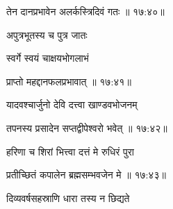 
{\devanagarifont तेन दानप्रभावेन अलर्कस्त्रिदिवं गतः {॥ १७:४०॥} \veg\dontdisplaylinenum }%

\ujvers{}

\nemslokab

{\devanagarifont अपुत्रभूतस्य च पुत्र जातः  \danda\dontdisplaylinenum }%
 
\nemslokac

{\devanagarifont स्वर्गे स्वयं चाक्षयभोगलाभं }%
  \dontdisplaylinenum    {}%



\nemslokad

{\devanagarifont प्राप्तो महद्दानफलप्रभावात् {॥ १७:४१॥} \veg\dontdisplaylinenum }%
 
\vers


{\devanagarifont यादवश्चार्जुनो देवि दत्त्वा खाण्डवभोजनम् \thinspace{\dandab} \dontdisplaylinenum }%


{\devanagarifont तपनस्य प्रसादेन सप्तद्वीपेश्वरो भवेत् {॥ १७:४२॥} \veg\dontdisplaylinenum }%

{\devanagarifont हरिणा च शिरां भित्त्वा दत्तं मे रुधिरं पुरा \thinspace{\dandab} \dontdisplaylinenum }%


{\devanagarifont प्रतीच्छितं कपालेन ब्रह्मसम्भवजेन मे {॥ १७:४३॥} \veg\dontdisplaylinenum }%

{\devanagarifont दिव्यवर्षसहस्राणि धारा तस्य न छिद्यते \thinspace{\dandab} \dontdisplaylinenum }%

